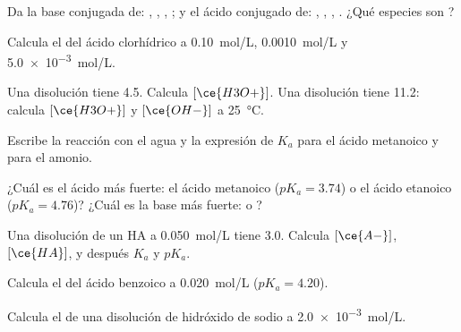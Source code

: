 \begin{exercise}[$\star$]\label{exo:g12:ka-and-pka:1}
Da la base conjugada de: , , , ; y
el ácido conjugado de: , , , . ¿Qué
especies son ?
\end{exercise}

\begin{exercise}[$\star$]\label{exo:g12:ka-and-pka:2}
Calcula el  del ácido clorhídrico a \qty{0.10}{mol/L},
\qty{0.0010}{mol/L} y \qty{5.0e-3}{mol/L}.
\end{exercise}

\begin{exercise}[$\star$]\label{exo:g12:ka-and-pka:3}
Una disolución tiene  4.5. Calcula $[\ce{H3O+}]$. Una disolución tiene
 11.2: calcula $[\ce{H3O+}]$ y $[\ce{OH-}]$ a \qty{25}{\celsius}.
\end{exercise}

\begin{exercise}[$\star$]\label{exo:g12:ka-and-pka:4}
Escribe la reacción con el agua y la expresión de $K_a$ para el ácido
metanoico y para el  amonio.
\end{exercise}

\begin{exercise}[$\star$]\label{exo:g12:ka-and-pka:5}
¿Cuál es el ácido más fuerte: el ácido metanoico ($pK_a = 3.74$) o el
ácido etanoico ($pK_a = 4.76$)? ¿Cuál es la base más fuerte: 
o ?
\end{exercise}

\begin{exercise}[$\star\star$]\label{exo:g12:ka-and-pka:6}
Una disolución de un  HA a \qty{0.050}{mol/L} tiene  3.0.
Calcula $[\ce{A-}]$, $[\ce{HA}]$, y después $K_a$ y $pK_a$.
\end{exercise}

\begin{exercise}[$\star\star$]\label{exo:g12:ka-and-pka:7}
Calcula el  del ácido benzoico a \qty{0.020}{mol/L} ($pK_a = 4.20$).
\end{exercise}

\begin{exercise}[$\star\star$]\label{exo:g12:ka-and-pka:8}
Calcula el  de una disolución de hidróxido de sodio a
\qty{2.0e-3}{mol/L}.
\end{exercise}

